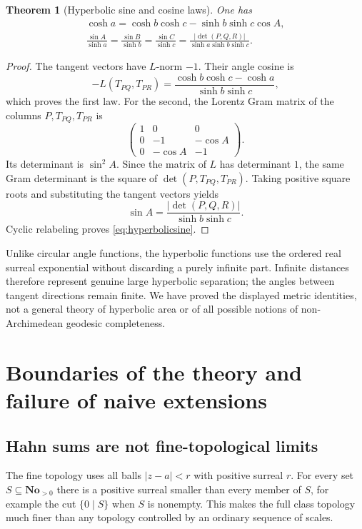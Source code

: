 \documentclass[11pt,letterpaper]{article}
\newtheorem{theorem}{Theorem}[section]
\theoremstyle{definition}
\theoremstyle{remark}
\newcommand{\No}{\mathbf{No}}
\numberwithin{equation}{section}
\begin{document}
\begin{theorem}[Hyperbolic sine and cosine laws]\label{thm:hyperbolic}
One has
\begin{gather}\label{eq:hyperboliccos}
 \cosh a=\cosh b\cosh c-\sinh b\sinh c\cos A,\\
 \frac{\sin A}{\sinh a}=\frac{\sin B}{\sinh b}
 =\frac{\sin C}{\sinh c}
 =\frac{|\det(P,Q,R)|}{\sinh a\sinh b\sinh c}.\label{eq:hyperbolicsine}
\end{gather}
\end{theorem}
\begin{proof}
The tangent vectors have $L$-norm $-1$. Their angle cosine is
\[
 -L(T_{PQ},T_{PR})
 =\frac{\cosh b\cosh c-\cosh a}{\sinh b\sinh c},
\]
which proves the first law. For the second, the Lorentz Gram matrix of the columns $P,T_{PQ},T_{PR}$ is
\[
 \begin{pmatrix}1&0&0\\0&-1&-\cos A\\0&-\cos A&-1\end{pmatrix}.
\]
Its determinant is $\sin^2 A$. Since the matrix of $L$ has determinant $1$, the same Gram determinant is the square of $\det(P,T_{PQ},T_{PR})$. Taking positive square roots and substituting the tangent vectors yields
\[
 \sin A=\frac{|\det(P,Q,R)|}{\sinh b\sinh c}.
\]
Cyclic relabeling proves \eqref{eq:hyperbolicsine}.
\end{proof}
Unlike circular angle functions, the hyperbolic functions use the ordered real surreal exponential without discarding a purely infinite part. Infinite distances therefore represent genuine large hyperbolic separation; the angles between tangent directions remain finite. We have proved the displayed metric identities, not a general theory of hyperbolic area or of all possible notions of non-Archimedean geodesic completeness.

\section{Boundaries of the theory and failure of naive extensions}\label{sec:limits}
\subsection{Hahn sums are not fine-topological limits}
The fine topology uses all balls $|z-a|<r$ with positive surreal $r$. For every set $S\subseteq\No_{>0}$ there is a positive surreal smaller than every member of $S$, for example the cut $\{0\mid S\}$ when $S$ is nonempty. This makes the full class topology much finer than any topology controlled by an ordinary sequence of scales.
\end{document}
